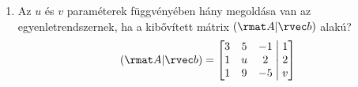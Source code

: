 \documentclass[a4paper, 12pt]{scrartcl}
\begin{document}
\begin{enumerate}
  \item Az $u$ és $v$ paraméterek függvényében hány megoldása van az
        egyenletrendszernek, ha a kibővített mátrix $(\rmat A | \rvec b)$ alakú?
        $$
          (\rmat A | \rvec b) =
          \left[
            \begin{matrix}
              3 & 5 & -1 \\
              1 & u & 2  \\
              1 & 9 & -5 \\
            \end{matrix}
            \;\middle|\;
            \begin{matrix}
              1 \\
              2 \\
              v \\
            \end{matrix}
          \right]
        $$
\end{enumerate}
\end{document}
